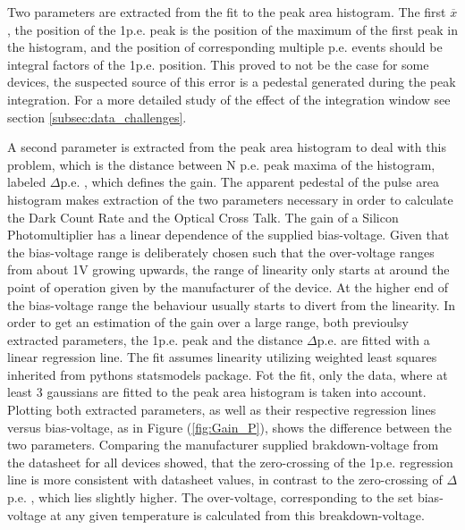 \documentclass[12pt,article,type=msc,colorback,accentcolor=tud9c]{tudthesis}
\begin{document}
Two parameters are extracted from the fit to the peak area histogram. The first {\large $\overline{x}$}, the position of the 1p.e. peak is the position of the maximum of the first peak in the histogram, and the position of corresponding multiple p.e. events should be integral factors of the 1p.e. position. This proved to not be the case for some devices, the suspected source of this error is a pedestal generated during the peak integration. For a more detailed study of the effect of the integration window see section {\ref{subsec:data_challenges}}.\\

\begin{wrapfigure}{R}{0.5\textwidth}
\centering
\texttt{[image: D:/OwnCloudData/00\_WriteUp/04\_Thesis/Pic/GainFit/\{GainFit\_delta\_pe]}.png}
\caption{\label{fig:Gain_P}1p.e. position and $\Delta$p.e. extracted from the Pulse Area histogram at every bias-voltage for HPK S12642 with their respective regression lines.}
\end{wrapfigure}

A second parameter is extracted from the peak area histogram to deal with this problem, which is the distance between N p.e. peak maxima of the histogram, labeled $\Delta$p.e. , which defines the gain. The apparent pedestal of the pulse area histogram makes extraction of the two parameters necessary in order to calculate the Dark Count Rate and the Optical Cross Talk. The gain of a Silicon Photomultiplier has a linear dependence of the supplied bias-voltage. Given that the bias-voltage range is deliberately chosen such that the over-voltage ranges from about 1V growing upwards, the range of linearity only starts at around the point of operation given by the manufacturer of the device. At the higher end of the bias-voltage range the behaviour usually starts to divert from the linearity. In order to get an estimation of the gain over a large range, both previoulsy extracted parameters, the 1p.e. peak and the distance $\Delta$p.e. are fitted with a linear regression line. The fit assumes linearity utilizing weighted least squares inherited from pythons statsmodels package. Fot the fit, only the data, where at least 3 gaussians are fitted to the peak area histogram is taken into account. Plotting both extracted parameters, as well as their respective regression lines versus bias-voltage, as in Figure (\ref{fig:Gain_P}), shows the difference between the two parameters. Comparing the manufacturer supplied brakdown-voltage from the datasheet for all devices showed, that the zero-crossing of the 1p.e. regression line is more consistent with datasheet values, in contrast to the zero-crossing of $\Delta$p.e. , which lies slightly higher. The over-voltage, corresponding to the set bias-voltage at any given temperature is calculated from this breakdown-voltage. 
\end{document}
